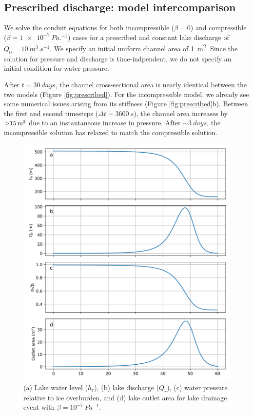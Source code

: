 \documentclass[11pt]{article}
\begin{document}
\subsection{Prescribed discharge: model intercomparison}
We solve the conduit equations for both incompressible ($\beta = 0$) and compressible ($\beta = \SI{1e-7}{Pa.^{-1}}$) cases for a prescribed and constant lake discharge of $Q_0 = \SI{10}{m^3.s^{-1}}$. We specify an initial uniform channel area of \SI{1}{m^2}. Since the solution for pressure and discharge is time-indpendent, we do not specify an initial condition for water pressure.

After $t = \SI{30}{days}$, the channel cross-sectional area is nearly identical between the two models (Figure \ref{fig:prescribed}). For the incompressible model, we already see some numerical issues arising from its stiffness (Figure \ref{fig:prescribed}b). Between the first and second timesteps ($\Delta t = \SI{3600}{s}$), the channel area increases by $\SI{>15}{m^2}$ due to an instantaneous increase in pressure. After $\sim\SI{3}{days}$, the incompressible solution has relaxed to match the compressible solution.


\begin{figure}[t]
\centering
\includegraphics[width=4.5in]{compressible_pressure_drainage.png}
\caption{(a) Lake water level ($h_r$), (b) lake discharge ($Q_r$), (c) water pressure relative to ice overburden, and (d) lake outlet area for lake drainage event with $\beta = 10^{-7}\SI{}{Pa^{-1}}$.}
\label{fig:drainage-event}
\end{figure}
\end{document}
